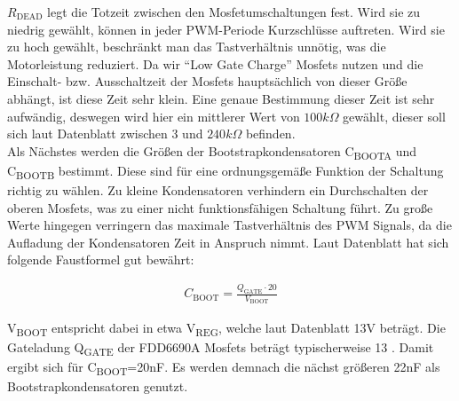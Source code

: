 $R_{\text{DEAD}}$ legt die Totzeit zwischen den Mosfetumschaltungen fest. Wird sie zu niedrig gewählt, können in jeder PWM-Periode Kurzschlüsse auftreten. Wird sie zu hoch
gewählt, beschränkt man das Tastverhältnis unnötig, was die Motorleistung reduziert. Da wir ``Low Gate Charge'' Mosfets nutzen und die Einschalt- bzw. Ausschaltzeit
der Mosfets hauptsächlich von dieser Größe abhängt, ist diese Zeit sehr klein. Eine genaue Bestimmung dieser Zeit ist sehr aufwändig, deswegen
wird hier ein mittlerer Wert von $100k\Omega$ gewählt, dieser soll sich laut Datenblatt zwischen 3 und $240k\Omega$ befinden.\\


%
% 
% 
% 



Als Nächstes werden die Größen der Bootstrapkondensatoren C\textsubscript{BOOTA} und C\textsubscript{BOOTB} bestimmt. Diese sind für eine ordnungsgemäße
Funktion der Schaltung richtig zu wählen. Zu kleine Kondensatoren verhindern ein Durchschalten der oberen Mosfets, was zu einer nicht funktionsfähigen Schaltung
führt. Zu große Werte hingegen verringern das maximale Tastverhältnis des PWM Signals, da die Aufladung der Kondensatoren Zeit in Anspruch nimmt.
Laut Datenblatt hat sich folgende Faustformel gut bewährt:

\begin{align*}
C_{\text{BOOT}}=\frac{Q_{\text{GATE}}\cdot20}{V_{\text{BOOT}}}
\end{align*}


V\textsubscript{BOOT} entspricht dabei in etwa V\textsubscript{REG}, welche laut Datenblatt \cite{ds-A3941} 13V beträgt.
Die Gateladung Q\textsubscript{GATE} der FDD6690A Mosfets beträgt typischerweise \SI{13}{\nC} \cite{ds-fs}. Damit ergibt sich für C\textsubscript{BOOT}=20nF. Es werden demnach
die nächst größeren 22nF als Bootstrapkondensatoren genutzt.\\

